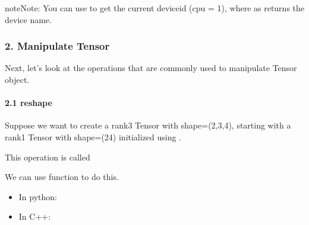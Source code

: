 \documentclass[letterpaper,10pt,english]{sphinxmanual}
\begin{document}
\begin{sphinxadmonition}{note}{Note:}
You can use  to get the current device\sphinxhyphen{}id (cpu = \sphinxhyphen{}1), where as  returns the device name.
\end{sphinxadmonition}


\subsubsection{2. Manipulate Tensor}
\label{\detokenize{guide/basic_obj/Tensor_2_manip:manipulate-tensor}}\label{\detokenize{guide/basic_obj/Tensor_2_manip::doc}}
Next, let’s look at the operations that are commonly used to manipulate Tensor object.


\paragraph{2.1 reshape}
\label{\detokenize{guide/basic_obj/Tensor_2_manip:reshape}}
Suppose we want to create a rank\sphinxhyphen{}3 Tensor with shape=(2,3,4), starting with a rank\sphinxhyphen{}1 Tensor with shape=(24) initialized using .

This operation is called 

We can use  function to do this.
\begin{itemize}
\item {} 
In python:

\end{itemize}

\begin{sphinxVerbatim}[commandchars=\\\{\},numbers=left,firstnumber=1,stepnumber=1]
  
  
\end{sphinxVerbatim}
\begin{itemize}
\item {} 
In C++:

\end{itemize}

\begin{sphinxVerbatim}[commandchars=\\\{\},numbers=left,firstnumber=1,stepnumber=1]
   
   
    
    
\end{sphinxVerbatim}
\end{document}
